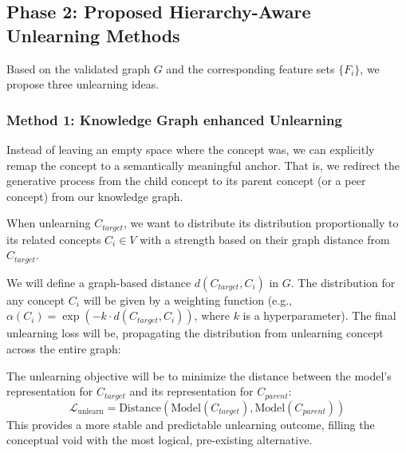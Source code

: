 \subsection{Phase 2: Proposed Hierarchy-Aware Unlearning Methods}
Based on the validated graph $G$ and the corresponding feature sets $\{F_i\}$, we propose three unlearning ideas.

\subsubsection{Method 1: Knowledge Graph enhanced Unlearning}

Instead of leaving an empty space where the concept was, we can explicitly remap the concept to a semantically meaningful anchor. That is, we redirect the generative process from the child concept to its parent concept (or a peer concept) from our knowledge graph.

When unlearning $C_{target}$, we want to distribute its distribution proportionally to its related concepts $C_i \in V$ with a strength based on their graph distance from $C_{target}$.

We will define a graph-based distance $d(C_{target}, C_i)$ in $G$. The distribution for any concept $C_i$ will be given by a weighting function (e.g., $\alpha(C_i) = \exp(-k \cdot d(C_{target}, C_i))$, where $k$ is a hyperparameter). The final unlearning loss will be, propagating the distribution from unlearning concept across the entire graph:

The unlearning objective will be to minimize the distance between the model's representation for $C_{target}$ and its representation for $C_{parent}$:
$$\mathcal{L}_{\text{unlearn}} = \text{Distance}(\text{Model}(C_{target}), \text{Model}(C_{parent}))$$
This provides a more stable and predictable unlearning outcome, filling the conceptual void with the most logical, pre-existing alternative.

